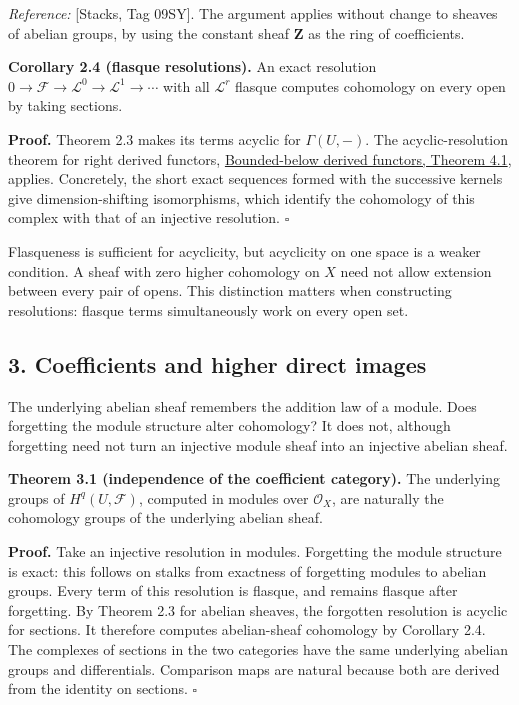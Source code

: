 \documentclass[11pt]{article}
\begin{document}
\emph{Reference:} {[}Stacks, Tag 09SY{]}. The argument applies without
change to sheaves of abelian groups, by using the constant sheaf
\(\mathbf Z\) as the ring of coefficients.

\textbf{Corollary 2.4 (flasque resolutions).} An exact resolution
\(0\to\mathcal F\to\mathcal L^0\to\mathcal L^1\to\cdots\) with all
\(\mathcal L^r\) flasque computes cohomology on every open by taking
sections.

\textbf{Proof.} Theorem 2.3 makes its terms acyclic for \(\Gamma(U,-)\).
The acyclic-resolution theorem for right derived functors,
\href{https://kokunoyumeto.github.io/open-math-courses/courses/derived-categories-and-sheaf-operations/injective-modules-and-bounded-below-derived-functors.html\#4-right-derived-functors-on-bounded-below-complexes}{Bounded-below
derived functors, Theorem 4.1}, applies. Concretely, the short exact
sequences formed with the successive kernels give dimension-shifting
isomorphisms, which identify the cohomology of this complex with that of
an injective resolution. \(\square\)

Flasqueness is sufficient for acyclicity, but acyclicity on one space is
a weaker condition. A sheaf with zero higher cohomology on \(X\) need
not allow extension between every pair of opens. This distinction
matters when constructing resolutions: flasque terms simultaneously work
on every open set.

\subsection{3. Coefficients and higher direct
images}\label{coefficients-and-higher-direct-images}

The underlying abelian sheaf remembers the addition law of a module.
Does forgetting the module structure alter cohomology? It does not,
although forgetting need not turn an injective module sheaf into an
injective abelian sheaf.

\textbf{Theorem 3.1 (independence of the coefficient category).} The
underlying groups of \(H^q(U,\mathcal F)\), computed in modules over
\(\mathcal O_X\), are naturally the cohomology groups of the underlying
abelian sheaf.

\textbf{Proof.} Take an injective resolution in modules. Forgetting the
module structure is exact: this follows on stalks from exactness of
forgetting modules to abelian groups. Every term of this resolution is
flasque, and remains flasque after forgetting. By Theorem 2.3 for
abelian sheaves, the forgotten resolution is acyclic for sections. It
therefore computes abelian-sheaf cohomology by Corollary 2.4. The
complexes of sections in the two categories have the same underlying
abelian groups and differentials. Comparison maps are natural because
both are derived from the identity on sections. \(\square\)
\end{document}
